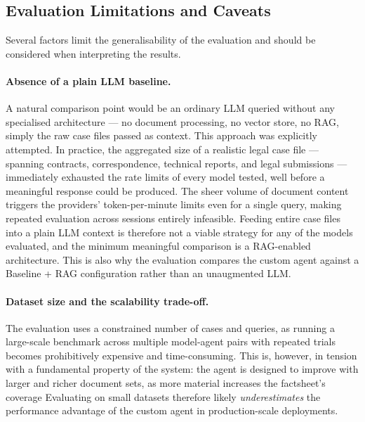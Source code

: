 

\subsection{Evaluation Limitations and Caveats}
\label{sec:dataset-limitations}

Several factors limit the generalisability of the evaluation and should be considered when interpreting the results.

\paragraph{Absence of a plain LLM baseline.}
A natural comparison point would be an ordinary LLM queried without any specialised architecture — no document processing, no vector store, no RAG, simply the raw case files passed as context. This approach was explicitly attempted. In practice, the aggregated size of a realistic legal case file — spanning contracts, correspondence, technical reports, and legal submissions — immediately exhausted the rate limits of every model tested, well before a meaningful response could be produced. The sheer volume of document content triggers the providers' token-per-minute limits even for a single query, making repeated evaluation across sessions entirely infeasible. Feeding entire case files into a plain LLM context is therefore not a viable strategy for any of the models evaluated, and the minimum meaningful comparison is a RAG-enabled architecture. This is also why the evaluation compares the custom agent against a Baseline + RAG configuration rather than an unaugmented LLM.

\paragraph{Dataset size and the scalability trade-off.}
The evaluation uses a constrained number of cases and queries, as running a large-scale benchmark across multiple model-agent pairs with repeated trials becomes prohibitively expensive and time-consuming. This is, however, in tension with a fundamental property of the system: the agent is designed to improve with larger and richer document sets, as more material increases the factsheet's coverage Evaluating on small datasets therefore likely \emph{underestimates} the performance advantage of the custom agent in production-scale deployments.

